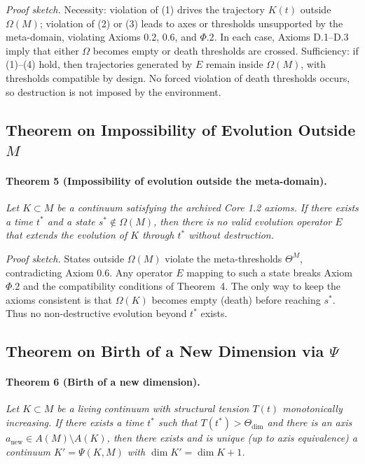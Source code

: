 \emph{Proof sketch.}
Necessity: violation of (1) drives the trajectory \(K(t)\) outside \(\Omega(M)\); violation of (2) or (3) leads to axes or thresholds unsupported by the meta-domain, violating Axioms 0.2, 0.6, and \(\Phi.2\).
In each case, Axioms D.1–D.3 imply that either \(\Omega\) becomes empty or death thresholds are crossed.
Sufficiency: if (1)–(4) hold, then trajectories generated by \(E\) remain inside \(\Omega(M)\), with thresholds compatible by design.
No forced violation of death thresholds occurs, so destruction is not imposed by the environment.

\subsection{Theorem on Impossibility of Evolution Outside \texorpdfstring{\(M\)}{M}}

\paragraph{Theorem 5 (Impossibility of evolution outside the meta-domain).}
\emph{Let \(K\subset M\) be a continuum satisfying the archived Core 1.2 axioms.
If there exists a time \(t^*\) and a state \(s^*\notin\Omega(M)\), then there is no valid evolution operator \(E\) that extends the evolution of \(K\) through \(t^*\) without destruction.}

\emph{Proof sketch.}
States outside \(\Omega(M)\) violate the meta-thresholds \(\Theta^M\), contradicting Axiom 0.6.
Any operator \(E\) mapping to such a state breaks Axiom \(\Phi.2\) and the compatibility conditions of Theorem~4.
The only way to keep the axioms consistent is that \(\Omega(K)\) becomes empty (death) before reaching \(s^*\).
Thus no non-destructive evolution beyond \(t^*\) exists.

\subsection{Theorem on Birth of a New Dimension via \texorpdfstring{\(\Psi\)}{\Psi}}

\paragraph{Theorem 6 (Birth of a new dimension).}
\emph{Let \(K\subset M\) be a living continuum with structural tension \(T(t)\) monotonically increasing.
If there exists a time \(t^*\) such that \(T(t^*)>\Theta_{\mathrm{dim}}\) and there is an axis \(a_{\mathrm{new}}\in A(M)\setminus A(K)\), then there exists and is unique (up to axis equivalence) a continuum \(K'=\Psi(K,M)\) with \(\dim K'=\dim K+1\).}

